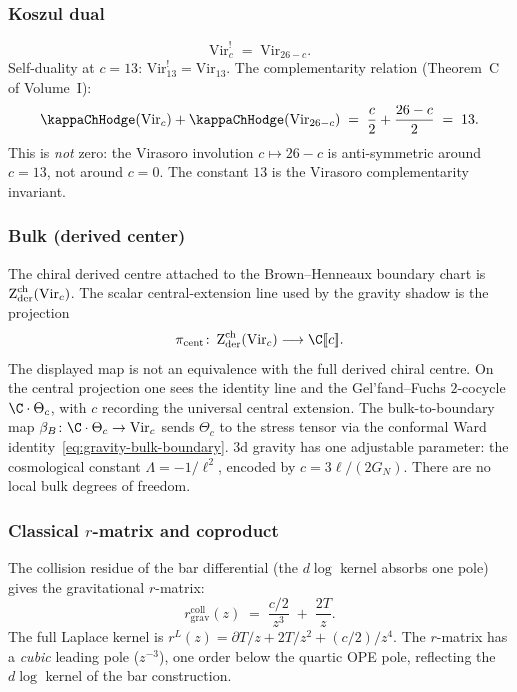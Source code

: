 \subsubsection*{Koszul dual}

\begin{equation}\label{eq:grav-koszul-dual}
\mathrm{Vir}_c^!
\;=\;
\mathrm{Vir}_{26-c}.
\end{equation}
Self-duality at $c = 13$:
$\mathrm{Vir}_{13}^! = \mathrm{Vir}_{13}$.
The complementarity relation (Theorem~C of Volume~I):
\[
\kappaChHodge(\mathrm{Vir}_c) + \kappaChHodge(\mathrm{Vir}_{26-c})
\;=\;
\frac{c}{2} + \frac{26-c}{2}
\;=\; 13.
\]
This is \emph{not} zero: the Virasoro involution
$c \mapsto 26 - c$ is anti-symmetric around $c = 13$,
not around $c = 0$.
The constant $13$ is the Virasoro
complementarity invariant.

\subsubsection*{Bulk (derived center)}

The chiral derived centre attached to the Brown--Henneaux boundary
chart is \(\operatorname{Z}_{\mathrm{der}}^{\mathrm{ch}}(\mathrm{Vir}_c)\).  The scalar
central-extension line used by the gravity shadow is the projection
\begin{equation}\label{eq:grav-derived-center}
\pi_{\mathrm{cent}}\colon
\Zder^{\mathrm{ch}}(\mathrm{Vir}_c)
\longrightarrow
\C[\![c]\!].
\end{equation}
The displayed map is not an equivalence with the full derived chiral
centre.  On the central projection one sees the identity line and the
Gel'fand--Fuchs \(2\)-cocycle
\(\C\cdot\Theta_c\), with \(c\) recording the universal central
extension.
The bulk-to-boundary map
\(\beta_B\colon \C\cdot\Theta_c\to \mathrm{Vir}_c\)
sends $\Theta_c$ to the stress tensor via the conformal
Ward identity~\eqref{eq:gravity-bulk-boundary}.
3d gravity has one adjustable parameter: the cosmological
constant $\Lambda = -1/\ell^2$, encoded by
$c = 3\ell/(2G_N)$.
There are no local bulk degrees of freedom.

\subsubsection*{Classical $r$-matrix and coproduct}

The collision residue of the bar differential (the $d\log$ kernel
absorbs one pole) gives the gravitational $r$-matrix:
\begin{equation}\label{eq:grav-r-matrix-package}
r^{\mathrm{coll}}_{\mathrm{grav}}(z)
\;=\;
\frac{c/2}{z^3} \;+\; \frac{2T}{z}.
\end{equation}
The full Laplace kernel is
$r^L(z) = \partial T/z + 2T/z^2 + (c/2)/z^4$.
The $r$-matrix has a \emph{cubic} leading pole ($z^{-3}$),
one order below the quartic OPE pole,
reflecting the $d\log$ kernel of the bar construction.

